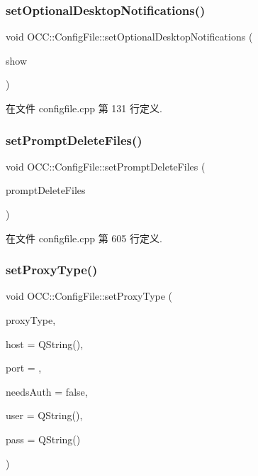 \subsubsection{\texorpdfstring{set\+Optional\+Desktop\+Notifications()}{setOptionalDesktopNotifications()}}
{\footnotesize\ttfamily void O\+C\+C\+::\+Config\+File\+::set\+Optional\+Desktop\+Notifications (\begin{DoxyParamCaption}\item[{bool}]{show }\end{DoxyParamCaption})}



在文件 configfile.\+cpp 第 131 行定义.

\mbox{\label{class_o_c_c_1_1_config_file_a51cd58394a5b0c134ba2e1eaa00bd991}} 
\subsubsection{\texorpdfstring{set\+Prompt\+Delete\+Files()}{setPromptDeleteFiles()}}
{\footnotesize\ttfamily void O\+C\+C\+::\+Config\+File\+::set\+Prompt\+Delete\+Files (\begin{DoxyParamCaption}\item[{bool}]{prompt\+Delete\+Files }\end{DoxyParamCaption})}



在文件 configfile.\+cpp 第 605 行定义.

\mbox{\label{class_o_c_c_1_1_config_file_a19b06f02130802695ebf578f343dbf9a}} 
\subsubsection{\texorpdfstring{set\+Proxy\+Type()}{setProxyType()}}
{\footnotesize\ttfamily void O\+C\+C\+::\+Config\+File\+::set\+Proxy\+Type (\begin{DoxyParamCaption}\item[{int}]{proxy\+Type,  }\item[{const Q\+String \&}]{host = {\ttfamily QString()},  }\item[{int}]{port = {},  }\item[{bool}]{needs\+Auth = {\ttfamily false},  }\item[{const Q\+String \&}]{user = {\ttfamily QString()},  }\item[{const Q\+String \&}]{pass = {\ttfamily QString()} }\end{DoxyParamCaption})}



